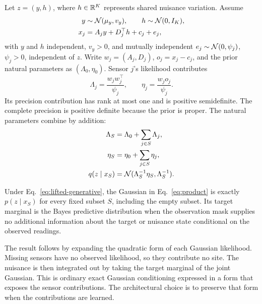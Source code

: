 Let \(z=(y,h)\), where \(h\in\mathbb{R}^K\) represents shared nuisance variation. Assume
\begin{equation}
\begin{aligned}
 y&\sim\mathcal{N}(\mu_y,v_y),\qquad h\sim\mathcal{N}(0,I_K),\\
 x_j&=A_jy+D_j^\top h+c_j+e_j ,
\end{aligned}
\label{eq:lifted-generative}
\end{equation}
with \(y\) and \(h\) independent, \(v_y>0\), and mutually independent \(e_j\sim\mathcal{N}(0,\psi_j)\), \(\psi_j>0\), independent of \(z\). Write \(w_j=(A_j,D_j)\), \(o_j=x_j-c_j\), and the prior natural parameters as \((\Lambda_0,\eta_0)\). Sensor \(j\)'s likelihood contributes
\begin{equation}
 \Lambda_j=\frac{w_jw_j^\top}{\psi_j},
 \qquad \eta_j=\frac{w_jo_j}{\psi_j}.
 \label{eq:site}
\end{equation}
Its precision contribution has rank at most one and is positive semidefinite. The complete precision is positive definite because the prior is proper. The natural parameters combine by addition:
\begin{equation}
\begin{aligned}
 \Lambda_S&=\Lambda_0+\sum_{j\in S}\Lambda_j,\\
 \eta_S&=\eta_0+\sum_{j\in S}\eta_j,\\
 q(z\mid x_S)&=\mathcal{N}(\Lambda_S^{-1}\eta_S,\Lambda_S^{-1}).
\end{aligned}
\label{eq:product}
\end{equation}

\begin{proposition}[Exactness]
\label{prop:exact}
Under Eq.~\eqref{eq:lifted-generative}, the Gaussian in Eq.~\eqref{eq:product} is exactly \(p(z\mid x_S)\) for every fixed subset \(S\), including the empty subset. Its target marginal is the Bayes predictive distribution when the observation mask supplies no additional information about the target or nuisance state conditional on the observed readings.
\end{proposition}

The result follows by expanding the quadratic form of each Gaussian likelihood. Missing sensors have no observed likelihood, so they contribute no site. The nuisance is then integrated out by taking the target marginal of the joint Gaussian. This is ordinary exact Gaussian conditioning expressed in a form that exposes the sensor contributions. The architectural choice is to preserve that form when the contributions are learned.

